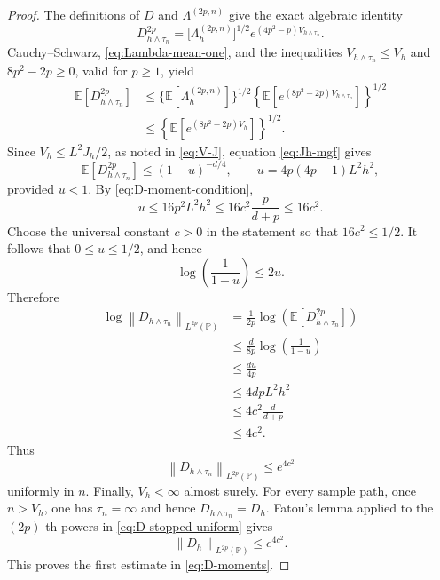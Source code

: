 \documentclass[11pt]{article}
\newcommand{\E}{\mathbb E}
\newcommand{\norm}[1]{\left\lVert #1\right\rVert}
\newcommand{\1}{\mathbf 1}
\begin{document}
\begin{proof}
		The definitions of \(D\) and \(\Lambda^{(2p,n)}\) give the exact algebraic
		identity
		\[
		D_{h\wedge\tau_n}^{2p}
		=
		\bigl[\Lambda_h^{(2p,n)}\bigr]^{1/2}
		e^{(4p^2-p)V_{h\wedge\tau_n}}.
		\]
		Cauchy--Schwarz, \eqref{eq:Lambda-mean-one}, and the inequalities
		\(V_{h\wedge\tau_n}\leq V_h\) and \(8p^2-2p\geq0\), valid for \(p\geq1\), yield
		\begin{align*}
			\E\left[D_{h\wedge\tau_n}^{2p}\right]
			&\leq
			\bigl\{\E[\Lambda_h^{(2p,n)}]\bigr\}^{1/2}
			\left\{
			\E\left[e^{(8p^2-2p)V_{h\wedge\tau_n}}\right]
			\right\}^{1/2}\\
			&\leq
			\left\{
			\E\left[e^{(8p^2-2p)V_h}\right]
			\right\}^{1/2}.
		\end{align*}
		Since \(V_h\leq L^2J_h/2\), as noted in \eqref{eq:V-J}, equation \eqref{eq:Jh-mgf} gives
		\[
		\E\left[D_{h\wedge\tau_n}^{2p}\right]
		\leq
		(1-u)^{-d/4},
		\qquad
		u=4p(4p-1)L^2h^2,
		\]
		provided \(u<1\). By \eqref{eq:D-moment-condition},
		\[
		u
		\leq16p^2L^2h^2
		\leq16c^2\frac{p}{d+p}
		\leq16c^2.
		\]
		Choose the universal constant \(c>0\) in the statement so that
		\(16c^2\leq1/2\). It follows that \(0\leq u\leq1/2\), and hence
		\[
		\log\left(\frac1{1-u}\right)\leq2u.
		\]
		Therefore
		\begin{align*}
			\log\norm{D_{h\wedge\tau_n}}_{L^{2p}(\mathbb P)}
			&=
			\frac1{2p}
			\log\left(
			\E\left[D_{h\wedge\tau_n}^{2p}\right]
			\right)\\
			&\leq
			\frac{d}{8p}\log\left(\frac1{1-u}\right)\\
			&\leq\frac{du}{4p}\\
			&\leq4dpL^2h^2\\
			&\leq4c^2\frac{d}{d+p}\\
			&\leq4c^2.
		\end{align*}
		Thus
		\begin{equation}\label{eq:D-stopped-uniform}
			\norm{D_{h\wedge\tau_n}}_{L^{2p}(\mathbb P)}
			\leq e^{4c^2}
		\end{equation}
		uniformly in \(n\). Finally, \(V_h<\infty\) almost surely. For every
		sample path, once \(n>V_h\), one has \(\tau_n=\infty\) and hence
		\(D_{h\wedge\tau_n}=D_h\). Fatou's lemma applied to the \((2p)\)-th
		powers in \eqref{eq:D-stopped-uniform} gives
		\begin{equation}\label{eq:D-2p-uniform}
			\norm{D_h}_{L^{2p}(\mathbb P)}
			\leq e^{4c^2}.
		\end{equation}
		This proves the first estimate in \eqref{eq:D-moments}.
		

\end{proof}
\end{document}
